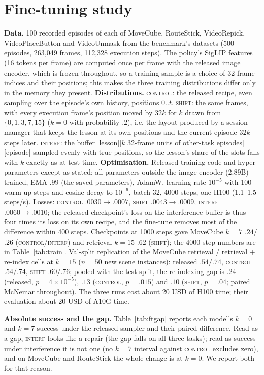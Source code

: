\documentclass{article}
\newcommand{\sys}[1]{\textsc{#1}}
\begin{document}
\section{Fine-tuning study}
\label{app:train}
\textbf{Data.} 100 recorded episodes of each of MoveCube, RouteStick, VideoRepick, VideoPlaceButton and VideoUnmask from the benchmark's datasets (500 episodes, 263{,}049 frames, 112{,}328 execution steps). The policy's SigLIP features (16 tokens per frame) are computed once per frame with the released image encoder, which is frozen throughout, so a training sample is a choice of 32 frame indices and their positions; this makes the three training distributions differ only in the memory they present.
\textbf{Distributions.} \sys{control}: the released recipe, even sampling over the episode's own history, positions $0..t$. \sys{shift}: the same frames, with every execution frame's position moved by $32k$ for $k$ drawn from $\{0,1,3,7,15\}$ ($k{=}0$ with probability $.2$), i.e. the layout produced by a session manager that keeps the lesson at its own positions and the current episode $32k$ steps later. \sys{interf}: the buffer [lesson][$k$ 32-frame units of other-task episodes][episode] sampled evenly with true positions, so the lesson's share of the slots falls with $k$ exactly as at test time.
\textbf{Optimisation.} Released training code and hyper-parameters except as stated: all parameters outside the image encoder (2.89B) trained, EMA $.99$ (the saved parameters), AdamW, learning rate $10^{-5}$ with 100 warm-up steps and cosine decay to $10^{-6}$, batch 32, 4000 steps, one H100 (1.1--1.5 steps/s). Losses: \sys{control} $.0030\to.0007$, \sys{shift} $.0043\to.0009$, \sys{interf} $.0060\to.0010$; the released checkpoint's loss on the interference buffer is thus four times its loss on its own recipe, and the fine-tune removes most of the difference within 400 steps. Checkpoints at 1000 steps gave MoveCube $k{=}7$ $.24$/$.26$ (\sys{control}/\sys{interf}) and retrieval $k{=}15$ $.62$ (\sys{shift}); the 4000-step numbers are in Table~\ref{tab:train}. Val-split replication of the MoveCube retrieval / retrieval + re-index cells at $k{=}15$ ($n{=}50$ new scene instances): released $.54/.74$, \sys{control} $.54/.74$, \sys{shift} $.60/.76$; pooled with the test split, the re-indexing gap is $.24$ (released, $p=4\times10^{-5}$), $.13$ (\sys{control}, $p=.015$) and $.10$ (\sys{shift}, $p=.04$; paired McNemar throughout). The three runs cost about 20 USD of H100 time; their evaluation about 20 USD of A10G time.

\textbf{Absolute success and the gap.} Table~\ref{tab:ftgap} reports each model's $k{=}0$ and $k{=}7$ success under the released sampler and their paired difference. Read as a gap, \sys{interf} looks like a repair (the gap falls on all three tasks); read as success under interference it is not one (no $k{=}7$ interval against \sys{control} excludes zero), and on MoveCube and RouteStick the whole change is at $k{=}0$. We report both for that reason.
\end{document}
